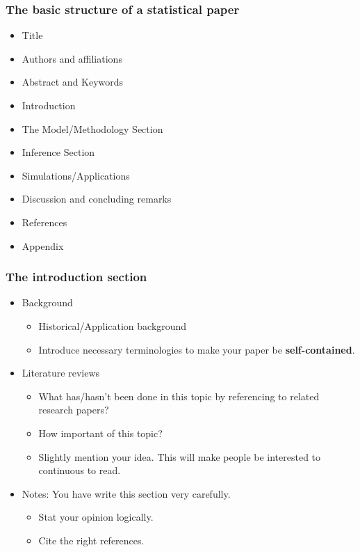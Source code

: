 \documentclass[10pt]{beamer}
\begin{document}
\begin{frame}
  \frametitle{The basic structure of a statistical paper}
  \begin{itemize}
  \item Title
  \item Authors and affiliations
  \item Abstract and Keywords
  \item Introduction
  \item The Model/Methodology Section
  \item Inference Section
  \item Simulations/Applications
  \item Discussion and concluding remarks
  \item References
  \item Appendix
  \end{itemize}
\end{frame}



\begin{frame}
  \frametitle{The introduction section}

  \begin{itemize}
  \item Background
    \begin{itemize}
    \item Historical/Application background
    \item Introduce necessary terminologies to make your paper be \textbf{self-contained}.
    \end{itemize}

  \item Literature reviews
    \begin{itemize}
    \item What has/hasn't been done in this topic by referencing to related
      research papers?
    \item How important of this topic?
    \item Slightly mention your idea. This will make people be interested to
      continuous to read.
    \end{itemize}
  \item Notes: You have write this section very carefully.
    \begin{itemize}
    \item Stat your opinion logically.
    \item Cite the right references.
    \end{itemize}
  \end{itemize}
\end{frame}
\end{document}
